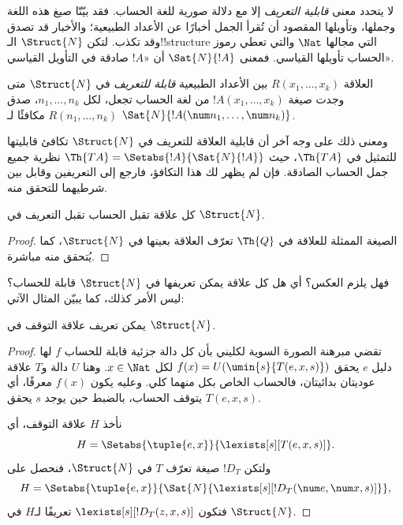 \documentclass[../../../include/open-logic-section]{subfiles}
\begin{document}


لا يتحدد معنى \emph{قابلية التعريف} إلا مع دلالة صورية للغة
الحساب. فقد بيّنّا صيغ هذه اللغة وجملها، وتأويلها المقصود أن
تُقرأ الجمل أخبارًا عن الأعداد الطبيعية؛ والأخبار قد تصدق وقد
تكذب. لتكن $\Struct{N}$ الـ!!{structure} التي مجالها $\Nat$
والتي تعطي رموز الحساب تأويلها القياسي.
فمعنى $\Sat{N}{!A}$ أن «$!A$ صادقة في التأويل القياسي».

\begin{defn}
العلاقة $R(x_1,\dots,x_k)$ بين الأعداد الطبيعية
\emph{قابلة للتعريف} في $\Struct{N}$ متى وجدت صيغة
$!A(x_1,\dots,x_k)$ من لغة الحساب تجعل، لكل
$n_1,\dots,n_k$، صدق $R(n_1,\dots,n_k)$ مكافئًا لـ
$\Sat{N}{!A(\num n_1,\dots,\num n_k)}$.
\end{defn}

ومعنى ذلك على وجه آخر أن قابلية العلاقة للتعريف في
$\Struct{N}$ تكافئ قابليتها للتمثيل في $\Th{TA}$،
حيث $\Th{TA} = \Setabs{!A}{\Sat{N}{!A}}$ نظرية جميع جمل
الحساب الصادقة. فإن لم يظهر لك هذا التكافؤ، فارجع إلى التعريفين
وقابل بين شرطيهما للتحقق منه.

\begin{lem}
كل علاقة تقبل الحساب تقبل التعريف في $\Struct{N}$.
\end{lem}

\begin{proof}
الصيغة الممثلة للعلاقة في $\Th{Q}$ تعرّف العلاقة بعينها في
$\Struct{N}$، كما يُتحقق منه مباشرة.
\end{proof}

فهل يلزم العكس؟ أي هل كل علاقة يمكن تعريفها في $\Struct{N}$
قابلة للحساب؟ ليس الأمر كذلك، كما يبيّن المثال الآتي:

\begin{lem}
يمكن تعريف علاقة التوقف في $\Struct{N}$.
\end{lem}

\begin{proof}
تقضي مبرهنة الصورة السوية لكليني بأن كل دالة جزئية قابلة للحساب
$f$ لها دليل $e$ يحقق $f(x) = U(\umin{s}{T(e,x,s)})$
لكل $x \in \Nat$. وهنا $U$ دالة و$T$ علاقة عوديتان بدائيتان،
فالحساب الخاص بكل منهما كلي. وعليه يكون $f(x)$ معرفًا،
أي يتوقف الحساب، بالضبط حين يوجد $s$ يحقق $T(e,x,s)$.

نأخذ $H$ علاقة التوقف، أي
\[
H = \Setabs{\tuple{e,x}}{\lexists[s][T(e, x, s)]}.
\]
ولتكن $!D_T$ صيغة تعرّف $T$ في $\Struct{N}$، فنحصل على
\[
H = \Setabs{\tuple{e,x}}{\Sat{N}{\lexists[s][!D_T(\num e, \num x, s)]}},
\]
فتكون $\lexists[s][!D_T(z, x, s)]$ تعريفًا لـ$H$ في
$\Struct{N}$.
\end{proof}
\end{document}

